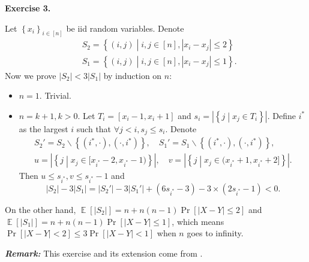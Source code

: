 \documentclass[a4paper]{article}
\newenvironment{exercise}[1]{
	\par
	\noindent\textbf{Exercise #1.}\quad
}{
	\par
	\bigskip
}
\DeclareMathOperator{\E}{\mathbb E}
\newcommand{\abs}[1]{\left| #1 \right|}
\newcommand{\cbra}[1]{\left\{ #1 \right\}}
\newcommand{\sbra}[1]{\left[ #1 \right]}
\begin{document}
\begin{exercise}{3}
    Let $\cbra{x_i}_{i\in[n]}$ be iid random variables.
    Denote 
    \begin{align*}
        &S_2=\cbra{(i,j)\middle| i,j\in[n],\abs{x_i-x_j}\leq2}\\
        &S_1=\cbra{(i,j)\middle| i,j\in[n],\abs{x_i-x_j}\leq1}.
    \end{align*}
    Now we prove $|S_2|<3|S_1|$ by induction on $n$:
    \begin{itemize}
        \item $n=1$. Trivial.
        \item $n=k+1,k>0$. Let $T_i=[x_i-1,x_i+1]$ and $s_i=\abs{\cbra{j\middle|x_j\in T_i}}$. Define $i^*$ as the 
            largest $i$ such that $\forall j<i,s_j\leq s_i$. Denote 
            \begin{gather*}
            S_2'=S_2\backslash\cbra{(i^*,\cdot),(\cdot,i^*)},\quad
            S_1'=S_1\backslash\cbra{(i^*,\cdot),(\cdot,i^*)}, \\
            u=\abs{\cbra{j\middle|x_j\in[x_{i^*}-2,x_{i^*}-1)}},\quad
            v=\abs{\cbra{j\middle|x_j\in(x_{i^*}+1,x_{i^*}+2]}}.
            \end{gather*}
            Then $u\leq s_{i^*},v\leq s_{i^*}-1$ and 
            $$
            |S_2|-3|S_1|=|S_2'|-3|S_1'|+(6s_{i^*}-3)-3\times(2s_{i^*}-1)<0.
            $$
    \end{itemize}
    On the other hand, $\E\sbra{|S_2|}=n+n(n-1)\Pr\sbra{\abs{X-Y}\leq 2}$ and $\E\sbra{|S_1|}=n+n(n-1)\Pr\sbra{\abs{X-Y}\leq 1}$,
    which means $\Pr[\abs{X-Y}<2]\leq3\Pr[\abs{X-Y}<1]$ when $n$ goes to infinity.
\end{exercise}
\noindent\textbf{\it Remark:} This exercise and its extension come from \cite{alon1995123}.
\end{document}
